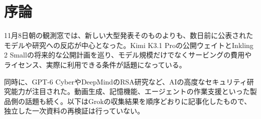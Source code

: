\section{序論}
11月8日朝の観測窓では、新しい大型発表そのものよりも、数日前に公表されたモデルや研究への反応が中心となった。Kimi K3.1 Proの公開ウェイトとInkling 2 Smallの将来的な公開計画を巡り、モデル規模だけでなくサービングの費用やライセンス、実際に利用できる条件が話題になっている。

同時に、GPT-6 CyberやDeepMindのRSA研究など、AIの高度なセキュリティ研究能力が注目された。動画生成、記憶機能、エージェントの作業支援といった製品側の話題も続く。以下はGrokの収集結果を順序どおりに記事化したもので、独立した一次資料の再検証は行っていない。
